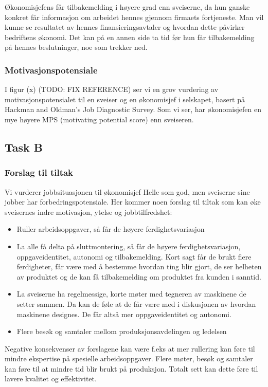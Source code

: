Økonomisjefens får tilbakemelding i høyere grad enn sveiserne, da hun ganske konkret får informasjon om arbeidet hennes gjennom firmaets fortjeneste. Man vil kunne se resultatet av hennes finansieringsavtaler og hvordan dette påvirker bedriftens økonomi. Det kan på en annen side ta tid før hun får tilbakemelding på hennes beslutninger, noe som trekker ned.

\subsubsection{Motivasjonspotensiale}
I figur (x) (TODO: FIX REFERENCE) ser vi en grov vurdering av motivasjonspotensialet til en sveiser og en økonomisjef i selskapet, basert på Hackman and Oldman’s Job Diagnostic Survey. Som vi ser, har økonomisjefen en mye høyere MPS (motivating potential score) enn sveiseren.


\subsection{Task B}
\subsubsection{Forslag til tiltak}
Vi vurderer jobbsituasjonen til økonomisjef Helle som god, men sveiserne sine jobber har forbedringspotensiale. Her kommer noen forslag til tiltak som kan øke sveisernes indre motivasjon, ytelse og jobbtilfredshet:

\begin{itemize}
  \item Ruller arbeidsoppgaver, så får de høyere ferdighetsvariasjon
  \item La alle få delta på sluttmontering, så får de høyere ferdighetsvariasjon, oppgaveidentitet, autonomi og tilbakemelding. Kort sagt får de brukt flere ferdigheter, får være med å bestemme hvordan ting blir gjort, de ser helheten av produktet og de kan få tilbakemelding om produktet fra kunden i sanntid.
  \item La sveiserne ha regelmessige, korte møter med tegneren av maskinene de setter sammen. Da kan de føle at de får være med i diskusjonen av hvordan maskinene designes. De får altså mer oppgaveidentitet og autonomi.
  \item Flere besøk og samtaler mellom produksjonsavdelingen og ledelsen
\end{itemize}

Negative konsekvenser av forslagene kan være f.eks at mer rullering kan føre til mindre ekspertise på spesielle arbeidsoppgaver. Flere møter, besøk og samtaler kan føre til at mindre tid blir brukt på produksjon. Totalt sett kan dette føre til lavere kvalitet og effektivitet.